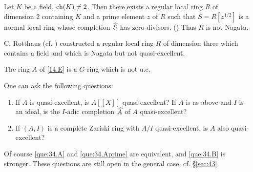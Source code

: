 \documentclass[../main]{subfiles}
\begin{document}
Let $K$ be a field, $\operatorname{ch}(K) \ne 2$. Then there exists a regular local ring $R$ of dimension $2$ containing $K$ and a prime element $z$ of $R$ such that $S = R[z^{1/2}]$ is a normal local ring whose completion $\widehat{S}$ has zero-divisors. (\cite[p.210, (E7.1)]{nagata1975local}) Thus $R$ is not Nagata.

C. Rotthaus (cf. \cite{rotthaus1977nicht}) constructed a regular local ring $R$ of dimension three which contains a field and which is Nagata but not quasi-excellent. 

The ring $A$ of \ref{14.E} is a $G$-ring which is not u.c. 

\newparagraph One can ask the following questions:

\begin{enumerate}[label=(\Alph*)]
    \item\label{que:34.A} If $A$ is quasi-excellent, is $A[[X]]$ quasi-excellent?
    \myitem[(A')]\label{que:34.Aprime} If $A$ is as above and $I$ is an ideal, is the $I$-adic completion $\widehat{A}$ of $A$ quasi-excellent? 
    \setcounter{enumi}{1}
    \item If $(A,I)$ is a complete Zariski ring with $A/I$ quasi-excellent, is $A$ also quasi-excellent?\label{que:34.B}
\end{enumerate}

Of course \ref{que:34.A} and \ref{que:34.Aprime} are equivalent, and \ref{que:34.B} is stronger. These questions are still open in the general case, cf. \S\ref{sec:43}.
\end{document}
